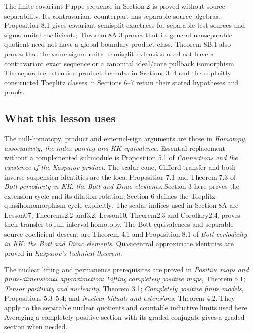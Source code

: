 \documentclass[
  11pt,
]{article}
\begin{document}
The finite covariant Puppe sequence in Section 2 is proved without
source separability. Its contravariant counterpart has separable source
algebras. Proposition 8.1 gives covariant semisplit exactness for
separable test sources and sigma-unital coefficients; Theorem 8A.3
proves that its general nonseparable quotient need not have a global
boundary-product class. Theorem 8B.1 also proves that the same
sigma-unital semisplit extension need not have a contravariant exact
sequence or a canonical ideal/cone pullback isomorphism. The separable
extension-product formulas in Sections 3--4 and the explicitly
constructed Toeplitz classes in Sections 6--7 retain their stated
hypotheses and proofs.

\subsection{What this lesson uses}\label{what-this-lesson-uses}

The null-homotopy, product and external-sign arguments are those in
\emph{Homotopy, associativity, the index pairing and KK-equivalence}.
Essential replacement without a complemented submodule is Proposition
5.1 of \emph{Connections and the existence of the Kasparov product}. The
scalar cone, Clifford transfer and both inverse suspension identities
are the local Proposition 7.1 and Theorem 7.3 of \emph{Bott periodicity
in KK: the Bott and Dirac elements}. Section 3 here proves the extension
cycle and its dilation rotation; Section 6 defines the Toeplitz
quasihomomorphism cycle explicitly. The scalar indices used in Section
8A are Lesson07, Theorems2.2 and3.2; Lesson10, Theorem2.3 and
Corollary2.4, proves their transfer to full interval homotopy. The Bott
equivalences and separable-source coefficient descent are Theorem 4.1
and Proposition 8.1 of \emph{Bott periodicity in KK: the Bott and Dirac
elements}. Quasicentral approximate identities are proved in
\emph{Kasparov's technical theorem}.

The nuclear lifting and permanence prerequisites are proved in
\emph{Positive maps and finite-dimensional approximation}: \emph{Lifting
completely positive maps}, Theorem 5.1; \emph{Tensor positivity and
nuclearity}, Theorem 3.1; \emph{Completely positive finite models},
Propositions 5.3--5.4; and \emph{Nuclear biduals and extensions},
Theorem 4.2. They apply to the separable nuclear quotients and countable
inductive limits used here. Averaging a completely positive section with
its graded conjugate gives a graded section when needed.
\end{document}
